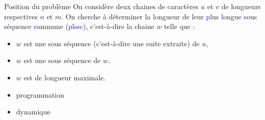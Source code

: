 \documentclass[10pt]{beamer}
\begin{document}
\begin{frame}{\Ctitle}{\stitle}
	\begin{exampleblock}{Position du problème}
		On considère deux chaines de caractères $u$ et $v$ de longueurs respectives $n$ et $m$. On cherche à déterminer la longueur de leur \textcolor{blue}{p}lus \textcolor{blue}{l}ongue \textcolor{blue}{s}ous \textcolor{blue}{s}équence \textcolor{blue}{c}ommune (\textcolor{blue}{plssc}), c'est-à-dire la chaine $w$ telle que :
		\begin{itemize}
			\item<2-> $w$ est une sous séquence (c'est-à-dire une suite extraite) de $u$,
			\item<3-> $w$ est une sous séquence de $w$,
			\item<4-> $w$ est de longueur maximale.
		\end{itemize}
		\begin{itemize}
			\item<6-> {\sc progr\textcolor{BrickRed}{a}m\textcolor{BrickRed}{m}at\textcolor{BrickRed}{i}on}
			\item<7-> {\sc dyn\textcolor{BrickRed}{ami}que}
		\end{itemize}
	\end{exampleblock}
\end{frame}
\end{document}
